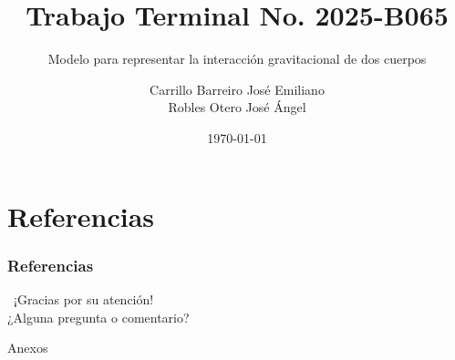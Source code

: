 \documentclass[spanish]{beamer}
\author[Carrillo B. José E. \&  Robles O. José A.]{Carrillo Barreiro José Emiliano \\ Robles Otero José Ángel}
\title{Trabajo Terminal No. 2025-B065}
\subtitle{Modelo para representar la interacción gravitacional de dos cuerpos}
\institute{Instituto Politécnico Nacional \\ Escuela Superior de Cómputo}
\date{\today}
\begin{document}
    \begin{frame}
        \titlepage%
    \end{frame}

    
    
    
    
    
    
    

    \section{Referencias}

    \begin{frame}[allowframebreaks]
        \frametitle{Referencias}
        \begingroup
        \fontsize{6pt}{7pt}\selectfont
        \printbibliography[heading=none]
        \endgroup
    \end{frame}

    \begin{frame}
        \begin{center}
            {\Huge\calligra~¡Gracias por su atención!}\\
            ¿Alguna pregunta o comentario?
        \end{center}
    \end{frame}

    \appendix
    \makeatletter
    \renewcommand{\thesection}{\Alph{section}}
    \makeatother
    \setcounter{section}{0}

    \begin{frame}
        \begingroup
            \begin{center}
                {\Huge Anexos}
            \end{center}
        \endgroup
    \end{frame}
    
    
    
    
\end{document}
